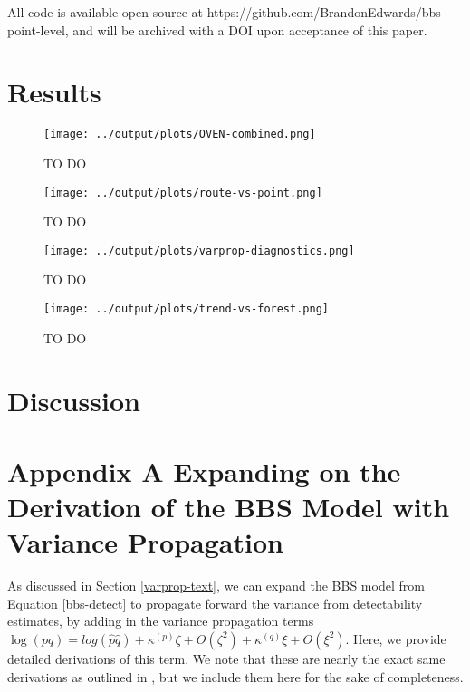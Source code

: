 \documentclass[12pt]{article}
\begin{document}
\par All code is available open-source at https://github.com/BrandonEdwards/bbs-point-level, and will be archived with a DOI upon acceptance of this paper.

\section{Results}

\begin{figure}[h]
	\texttt{[image: ../output/plots/OVEN-combined.png]}
	\caption{TO DO}
	\label{fig:oven-combined}
\end{figure}

\begin{figure}[h]
	\texttt{[image: ../output/plots/route-vs-point.png]}
	\caption{TO DO}
	\label{fig:route-vs-point}
\end{figure}

\begin{figure}[h]
	\texttt{[image: ../output/plots/varprop-diagnostics.png]}
	\caption{TO DO}
	\label{fig:varprop-diagnostics}
\end{figure}

\begin{figure}[h]
	\texttt{[image: ../output/plots/trend-vs-forest.png]}
	\caption{TO DO}
	\label{fig:trend-vs-forest}
\end{figure}



\section{Discussion}


	


	
\section{Appendix A Expanding on the Derivation of the BBS Model with Variance Propagation}

\par As discussed in Section \ref{varprop-text}, we can expand the BBS model from Equation \ref{bbs-detect} to propagate forward the variance from detectability estimates, by adding in the variance propagation terms $	\log(pq) = log(\hat{p} \hat{q}) + \kappa^{(p)}\zeta + O(\zeta^2) + \kappa^{(q)}\xi + O(\xi^2)$.
Here, we provide detailed derivations of this term.
We note that these are nearly the exact same derivations as outlined in \citet{bravington_variance_2021}, but we include them here for the sake of completeness.
\end{document}
